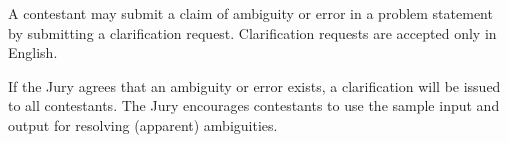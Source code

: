 
A contestant may submit a claim of ambiguity or error in a problem
statement by submitting a clarification request.
Clarification requests are accepted only in English.

If the Jury agrees that an ambiguity or error exists, a clarification will
be issued to all contestants.
The Jury encourages contestants to use the sample input and output for
resolving (apparent) ambiguities.
